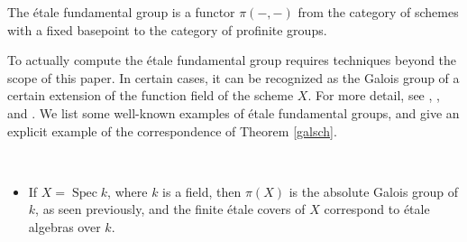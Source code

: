 \documentclass[11pt,openany]{book} %
\newcommand{\spc}{\operatorname{Spec}}
\begin{document}
\begin{proposition}
The \'etale fundamental group is a functor $\pi(-,-)$ from the category of schemes with a fixed basepoint to the category of profinite groups.
\end{proposition}

To actually compute the \'etale fundamental group requires techniques beyond the scope of this paper. In certain cases, it can be recognized as the Galois group of a certain extension of the function field of the scheme $X$. For more detail, see \cite{lenstra}, \cite{tsimerman}, and \cite{milne}. We list some well-known examples of \'etale fundamental groups, and give an explicit example of the correspondence of Theorem \ref{galsch}.\\
\pagebreak

\begin{example}\
\begin{itemize}
	\item If $X = \spc k$, where $k$ is a field, then $\pi(X)$ is the absolute Galois group of $k$, as seen previously, and the finite \'etale covers of $X$ correspond to \'etale algebras over $k$.
    

\end{itemize}
\end{example}
\end{document}
